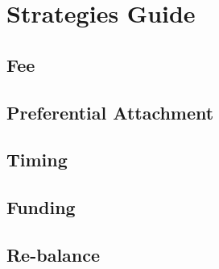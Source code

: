 \chapter{Strategies Guide}
\label{chapter:strategies}

\section{Fee}
\section{Preferential Attachment}
\section{Timing}
\section{Funding}
\section{Re-balance}
